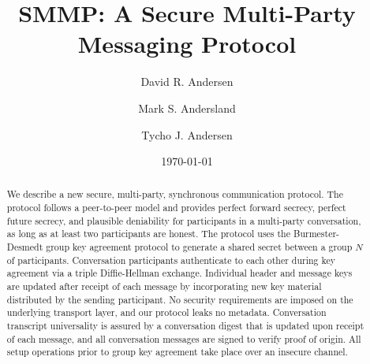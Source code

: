 \documentclass[%
preprint,
amsmath,amssymb,
aps,
prb,
floatfix,
]{revtex4-1}
\begin{document}

\title{SMMP: A Secure Multi-Party Messaging Protocol}%

\author{David R. Andersen}
\author{Mark S. Andersland}
\author{Tycho J. Andersen}

\date{\today}%

\begin{abstract}
We describe a new secure, multi-party, synchronous communication protocol.
The protocol follows a peer-to-peer model and provides perfect forward
secrecy, perfect future secrecy, and plausible deniability for participants in
a multi-party conversation, as long as at least two participants are honest.
The protocol uses the Burmester-Desmedt group key agreement
protocol to generate a shared secret between a group $N$ of participants.
Conversation participants authenticate to each other
during key agreement via a triple Diffie-Hellman exchange.
Individual header and message keys are updated after receipt of each message by incorporating
new key material distributed by the sending participant.
No security requirements are imposed on the underlying transport layer, and
our protocol leaks no metadata.
Conversation transcript universality is assured by a conversation digest that is updated
upon receipt of each message, and all conversation messages are signed to
verify proof of origin.
All setup operations prior to group key agreement take place over an insecure
channel.
\end{abstract}

\maketitle

\end{document}
